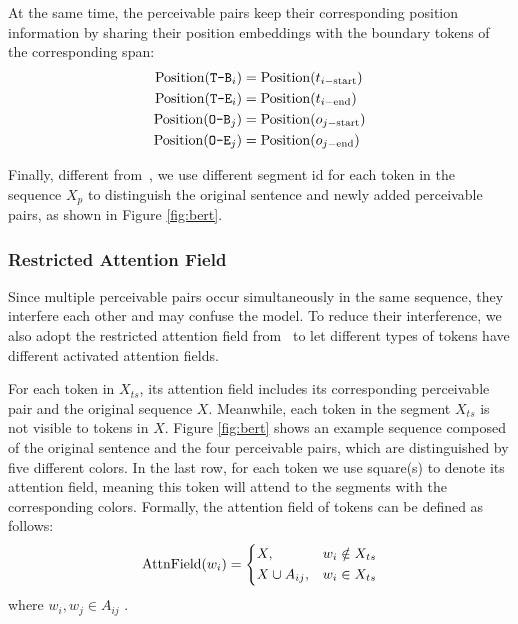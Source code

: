 \documentclass[11pt]{article}
\begin{document}
At the same time, the perceivable pairs keep their corresponding position information by sharing their position embeddings with the boundary tokens of the corresponding span:
\begin{equation}
\begin{aligned}
    {\rm Position}(\texttt{T-B}_i)&= {\rm Position}(t_{i-{\rm start}}) \\
    {\rm Position}(\texttt{T-E}_i)&= {\rm Position}(t_{i-{\rm end}}) \\
    {\rm Position}(\texttt{O-B}_j)&= {\rm Position}(o_{j-{\rm start}}) \\
    {\rm Position}(\texttt{O-E}_j)&= {\rm Position}(o_{j-{\rm end}})
\end{aligned}
\end{equation}

Finally, different from~\cite{zhong2020frustratingly},
we use different segment id for each token in the sequence $X_p$ to distinguish the original sentence and newly added perceivable pairs, as shown in Figure \ref{fig:bert}.
\subsubsection{Restricted Attention Field}
Since multiple perceivable pairs occur simultaneously in the same sequence,
they interfere each other and may confuse the model. To reduce their interference, we also adopt the restricted attention field from~\cite{zhong2020frustratingly} to let different types of tokens have different activated attention fields.

For each token in $X_{ts}$, its attention field includes its corresponding perceivable pair and the original sequence $X$.
Meanwhile, each token in the segment $X_{ts}$ is not visible to tokens in $X$.  
Figure \ref{fig:bert}
shows an example sequence composed of the original sentence and the four perceivable pairs,  which are distinguished by five different colors.
In the last row, for each token we use  square(s) to denote its attention field, meaning this token will attend to the segments with the corresponding colors. 
Formally, the attention field of tokens can be defined as follows:
\begin{equation}
    {\rm AttnField}(w_i)=\left\{
    \begin{aligned}
        & X, & w_i \notin X_{ts}\\
        & X \cup A_{ij}, & w_i \in X_{ts}
    \end{aligned}
    \right.
\end{equation}
where $w_i, w_j \in A_{ij}$ .
\end{document}
